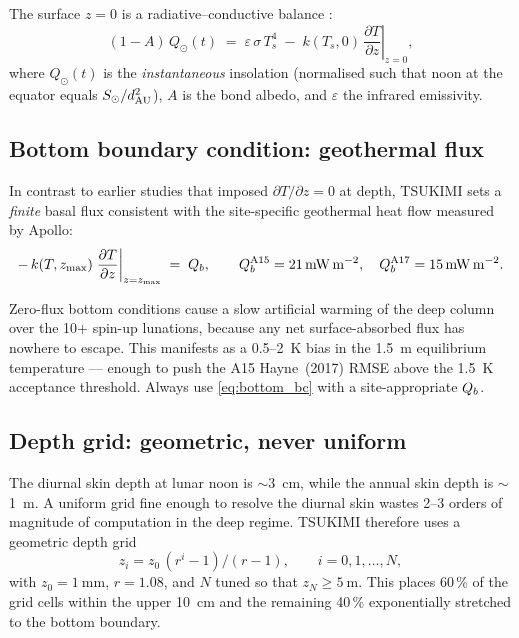 The surface $z=0$ is a radiative--conductive balance
\citep{vasavada1999}:
\begin{equation}
  (1-A)\,Q_\odot(t)
  \;=\;
  \varepsilon\,\sigma\,T_s^{4}
  \;-\;
  k(T_s,0)\,\left.\frac{\partial T}{\partial z}\right|_{z=0},
  \label{eq:surface_bc}
\end{equation}
where $Q_\odot(t)$ is the \emph{instantaneous} insolation (normalised
such that noon at the equator equals $S_{\odot} / d_{\mathrm{AU}}^2$),
$A$ is the bond albedo, and $\varepsilon$ the infrared emissivity.

\subsection{Bottom boundary condition: geothermal flux}

In contrast to earlier studies that imposed $\partial T / \partial z
= 0$ at depth, TSUKIMI sets a \emph{finite} basal flux consistent with
the site-specific geothermal heat flow measured by Apollo:
\begin{equation}
  -\,k(T,z_{\max})\left.\frac{\partial T}{\partial z}\right|_{z=z_{\max}}
  \;=\;
  Q_{b},
  \qquad
  Q_{b}^{\text{A15}} = \SI{21}{\milli\watt\per\meter\squared},
  \quad
  Q_{b}^{\text{A17}} = \SI{15}{\milli\watt\per\meter\squared}.
  \label{eq:bottom_bc}
\end{equation}

\begin{warning}
Zero-flux bottom conditions cause a slow artificial warming of the
deep column over the \num{10}+ spin-up lunations, because any net
surface-absorbed flux has nowhere to escape.  This manifests as a
0.5--\SI{2}{\kelvin} bias in the \SI{1.5}{\meter} equilibrium
temperature --- enough to push the A15 Hayne~(2017) RMSE above the
\SI{1.5}{\kelvin} acceptance threshold.  Always use
\cref{eq:bottom_bc} with a site-appropriate $Q_{b}$.
\end{warning}

\subsection{Depth grid: geometric, never uniform}

The diurnal skin depth at lunar noon is $\sim$\SI{3}{\centi\meter},
while the annual skin depth is $\sim$\SI{1}{\meter}.  A uniform grid
fine enough to resolve the diurnal skin wastes 2--3 orders of
magnitude of computation in the deep regime.  TSUKIMI therefore uses
a geometric depth grid
\begin{equation}
  z_i = z_0\,\left(r^{i} - 1\right)/(r-1),
  \qquad i = 0, 1, \dots, N,
  \label{eq:geo_grid}
\end{equation}
with $z_0 = \SI{1}{\milli\meter}$, $r = 1.08$, and $N$ tuned so that
$z_N \ge \SI{5}{\meter}$.  This places 60\,\% of the grid cells within
the upper \SI{10}{\centi\meter} and the remaining 40\,\% exponentially
stretched to the bottom boundary.

